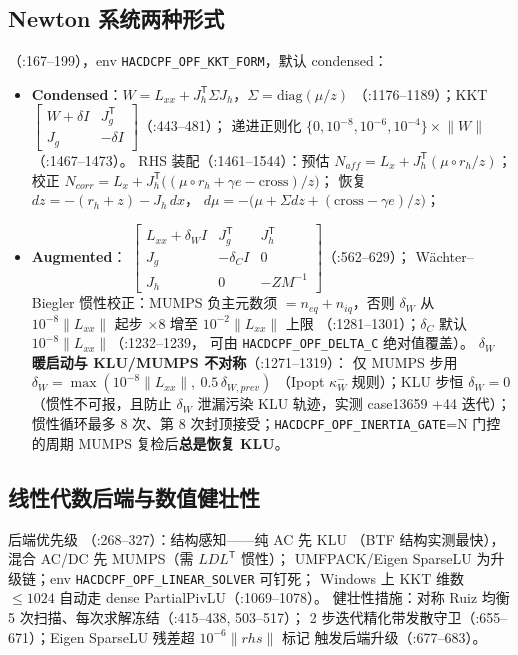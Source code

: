 \subsection{Newton 系统两种形式}
（:167--199），env \texttt{HACDCPF\_OPF\_KKT\_FORM}，默认 condensed：
\begin{itemize}
  \item \textbf{Condensed}：$W=L_{xx}+J_h^{\mathsf T}\Sigma J_h$，$\Sigma=\mathrm{diag}(\mu/z)$
        （:1176--1189）；KKT
        $\begin{bmatrix}W+\delta I & J_g^{\mathsf T}\\ J_g & -\delta I\end{bmatrix}$（:443--481）；
        递进正则化 $\{0,10^{-8},10^{-6},10^{-4}\}\times\lVert W\rVert$（:1467--1473）。
        RHS 装配（:1461--1544）：预估 $N_{aff}=L_x+J_h^{\mathsf T}(\mu\circ r_h/z)$；
        校正 $N_{corr}=L_x+J_h^{\mathsf T}\big((\mu\circ r_h+\gamma e-\mathrm{cross})/z\big)$；
        恢复 $dz=-(r_h+z)-J_h\,dx$，
        $d\mu=-\big(\mu+\Sigma dz+(\mathrm{cross}-\gamma e)/z\big)$；
  \item \textbf{Augmented}：
        $\begin{bmatrix}L_{xx}+\delta_W I & J_g^{\mathsf T} & J_h^{\mathsf T}\\
        J_g & -\delta_C I & 0\\ J_h & 0 & -ZM^{-1}\end{bmatrix}$（:562--629）；
        Wächter--Biegler 惯性校正：MUMPS 负主元数须 $=n_{eq}+n_{iq}$，否则 $\delta_W$
        从 $10^{-8}\lVert L_{xx}\rVert$ 起步 $\times8$ 增至 $10^{-2}\lVert L_{xx}\rVert$ 上限
        （:1281--1301）；$\delta_C$ 默认 $10^{-8}\lVert L_{xx}\rVert$（:1232--1239，
        可由 \texttt{HACDCPF\_OPF\_DELTA\_C} 绝对值覆盖）。
        \textbf{$\delta_W$ 暖启动与 KLU/MUMPS 不对称}（:1271--1319）：
        仅 MUMPS 步用 $\delta_W=\max(10^{-8}\lVert L_{xx}\rVert,\ 0.5\,\delta_{W,prev})$
        （Ipopt $\kappa_W^-$ 规则）；KLU 步恒 $\delta_W=0$（惯性不可报，且防止
        $\delta_W$ 泄漏污染 KLU 轨迹，实测 case13659 +44 迭代）；
        惯性循环最多 8 次、第 8 次封顶接受；\texttt{HACDCPF\_OPF\_INERTIA\_GATE}=N
        门控的周期 MUMPS 复检后\textbf{总是恢复 KLU}。
\end{itemize}

\subsection{线性代数后端与数值健壮性}
后端优先级 （:268--327）：结构感知——纯 AC 先 KLU
（BTF 结构实测最快），混合 AC/DC 先 MUMPS（需 $LDL^{\mathsf T}$ 惯性）；
UMFPACK/Eigen SparseLU 为升级链；env \texttt{HACDCPF\_OPF\_LINEAR\_SOLVER} 可钉死；
Windows 上 KKT 维数 $\le1024$ 自动走 dense PartialPivLU（:1069--1078）。
健壮性措施：对称 Ruiz 均衡 5 次扫描、每次求解冻结（:415--438, 503--517）；
2 步迭代精化带发散守卫（:655--671）；Eigen SparseLU 残差超
$10^{-6}\lVert rhs\rVert$ 标记  触发后端升级（:677--683）。

